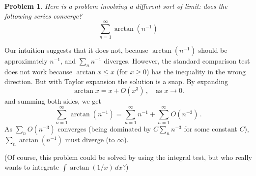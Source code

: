 \documentclass[12pt]{article}
\newtheorem*{prob}{Problem}
\begin{document}
\begin{prob}
Here is a problem involving a different sort of limit:
does the following series converge?
\[
\sum_{n=1}^\infty \arctan(n^{-1})
\]
\end{prob}
Our intuition suggests that it does not, because 
$\arctan (n^{-1})$ should be approximately $n^{-1}$, and $\sum_n n^{-1}$  diverges.
However, the standard comparison test does not work
because $\arctan x \leq x$ (for $x \geq 0$) has the inequality in the wrong direction.
But with Taylor expansion the solution is a snap.
By expanding
\[
\arctan x = x + O(x^3) \,, \quad \text{as $x \to 0$.}
\]
and summing both sides, we get
\[
\sum_{n=1}^\infty \arctan (n^{-1} ) = \sum_{n=1}^\infty n^{-1} + \sum_{n=1}^\infty O(n^{-3})\,.
\]
As $\sum_n O(n^{-3})$ converges (being dominated by $C\sum_n n^{-3}$ for some constant $C$), $\sum_n \arctan(n^{-1})$ must diverge (to $\infty$).

(Of course, this problem could be solved by using the integral test,
but who really wants to integrate $\int \arctan (1/x) \, dx$?)
\end{document}
